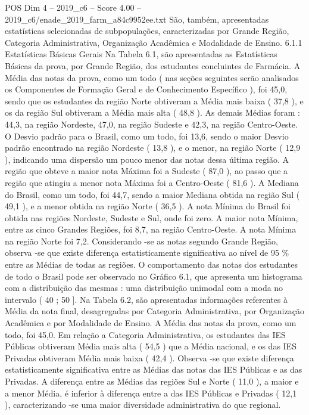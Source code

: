 \begin{textsample}{POS Dim 4 – 2019\_c6 – Score 4.00 – 2019\_c6/enade\_2019\_farm\_a84c9952ee.txt}
São, também, apresentadas estatísticas selecionadas de subpopulações, caracterizadas por Grande Região, Categoria Administrativa, Organização Acadêmica e Modalidade de Ensino. 6.1.1 Estatísticas Básicas Gerais Na Tabela 6.1, são apresentadas as Estatísticas Básicas da prova, por Grande Região, dos estudantes concluintes de Farmácia.
A Média das notas da prova, como um todo ( nas seções seguintes serão analisados os Componentes de Formação Geral e de Conhecimento Específico ), foi 45,0, sendo que os estudantes da região Norte obtiveram a Média mais baixa ( 37,8 ), e os da região Sul obtiveram a Média mais alta ( 48,8 ).
As demais Médias foram : 44,3, na região Nordeste, 47,0, na região Sudeste e 42,3, na região Centro-Oeste.
O Desvio padrão para o Brasil, como um todo, foi 13,6, sendo o maior Desvio padrão encontrado na região Nordeste ( 13,8 ), e o menor, na região Norte ( 12,9 ), indicando uma dispersão um pouco menor das notas dessa última região.
A região que obteve a maior nota Máxima foi a Sudeste ( 87,0 ), ao passo que a região que atingiu a menor nota Máxima foi a Centro-Oeste ( 81,6 ).
A Mediana do Brasil, como um todo, foi 44,7, sendo a maior Mediana obtida na região Sul ( 49,1 ), e a menor obtida na região Norte ( 36,5 ).
A nota Mínima do Brasil foi obtida nas regiões Nordeste, Sudeste e Sul, onde foi zero.
A maior nota Mínima, entre as cinco Grandes Regiões, foi 8,7, na região Centro-Oeste.
A nota Mínima na região Norte foi 7,2.
Considerando -se as notas segundo Grande Região, observa -se que existe diferença estatisticamente significativa ao nível de 95 \% entre as Médias de todas as regiões.
O comportamento das notas dos estudantes de todo o Brasil pode ser observado no Gráfico 6.1, que apresenta um histograma com a distribuição das mesmas : uma distribuição unimodal com a moda no intervalo ( 40 ; 50 ].
Na Tabela 6.2, são apresentadas informações referentes à Média da nota final, desagregadas por Categoria Administrativa, por Organização Acadêmica e por Modalidade de Ensino.
A Média das notas da prova, como um todo, foi 45,0.
Em relação a Categoria Administrativa, os estudantes das IES Públicas obtiveram Média mais alta ( 54,5 ) que a Média nacional, e os das IES Privadas obtiveram Média mais baixa ( 42,4 ).
Observa -se que existe diferença estatisticamente significativa entre as Médias das notas das IES Públicas e as das Privadas.
A diferença entre as Médias das regiões Sul e Norte ( 11,0 ), a maior e a menor Média, é inferior à diferença entre a das IES Públicas e Privadas ( 12,1 ), caracterizando -se uma maior diversidade administrativa do que regional.

\end{textsample}
